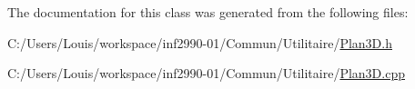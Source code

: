 The documentation for this class was generated from the following files\+:\begin{DoxyCompactItemize}
\item 
C\+:/\+Users/\+Louis/workspace/inf2990-\/01/\+Commun/\+Utilitaire/\hyperlink{_plan3_d_8h}{Plan3\+D.\+h}\item 
C\+:/\+Users/\+Louis/workspace/inf2990-\/01/\+Commun/\+Utilitaire/\hyperlink{_plan3_d_8cpp}{Plan3\+D.\+cpp}\end{DoxyCompactItemize}
